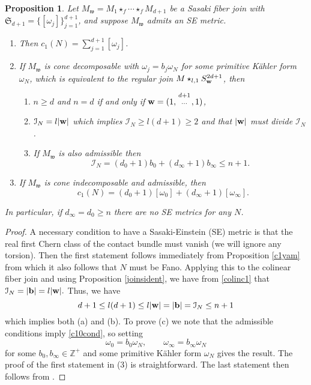 \documentclass[12pt]{amsart}
\newtheorem{proposition}[theorem]{Proposition}
\def\fract#1#2{\raise4pt\hbox{$ #1 \atop #2 $}}
\def\bbz{{\mathbb Z}}
\def\gro{\omega}
\def\bfb{{\bf b}}
\def\bfw{{\bf w}}
\def\cali{{\mathcal I}}
\def\gw{{\mathfrak w}}
\def\gS{{\mathfrak S}}
\begin{document}
\begin{proposition}\label{SEprop}
Let $M_\gw=M_1\star_f\cdots \star_fM_{d+1}$ be a Sasaki fiber join with $\gS_{d+1}=\{[\gro_j]\}_{j=1}^{d+1}$, and suppose $M_\gw$ admits an SE metric. 
\begin{enumerate}
\item Then $c_1(N)=\sum_{j=1}^{d+1}[\gro_j]$. 
\item If $M_\gw$ is cone decomposable with $\gro_j=b_j\gro_N$ for some primitive K\"ahler form $\gro_N$, which is equivalent to the regular join $M\star_{l,1}S^{2d+1}_\bfw$, then
\begin{enumerate}
\item $n\geq d$ and $n=d$ if and only if $\bfw=(1,\fract{d+1}{\ldots},1)$,
\item  $\cali_N=l|\bfw|$ which implies $\cali_N\geq l(d+1)\geq 2$ and that $|\bfw|$ must divide $\cali_N$.
\item If $M_\gw$ is also admissible then 
$$\cali_N=(d_0+1)b_0+(d_\infty +1)b_\infty\leq n+1.$$
\end{enumerate}
\item If $M_\gw$ is cone indecomposable and admissible, then 
\begin{equation}\label{c10cond}
c_1(N)=(d_0+1)[\gro_0]+(d_\infty +1)[\gro_\infty].
\end{equation} 
\end{enumerate}
In particular, if $d_\infty=d_0\geq n$ there are no SE metrics for any $N$.
\end{proposition}

\begin{proof}
A necessary condition to have a Sasaki-Einstein (SE) metric is that the real first Chern class of the contact bundle must vanish (we will ignore any torsion). Then the first statement follows immediately from Proposition \ref{c1yam} from which it also follows that $N$ must be Fano. Applying this to the colinear fiber join and using Proposition \ref{joinsident}, we have from \eqref{colinc1} that $\cali_N=|\bfb|=l|\bfw|.$ Thus, we have
\begin{equation}\label{Fanoob}
d+1\leq l(d+1)\leq l|\bfw|=|\bfb|=\cali_N\leq n+1
\end{equation}
which implies both (a) and (b). To prove (c) we note that the admissible conditions imply \eqref{c10cond}, so setting 
$$\gro_0=b_0\gro_N, \qquad \gro_\infty=b_\infty\gro_N$$
for some $b_0,b_\infty\in\bbz^+$ and some primitive K\"ahler form $\gro_N$ gives the result.
The proof of the first statement in (3)  is straightforward. The last statement then follows from \cite{KoOc73}.
\end{proof}
\end{document}
